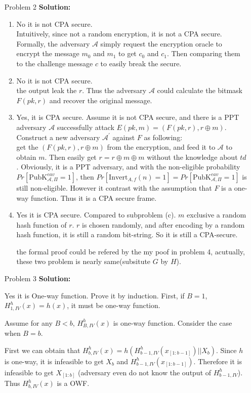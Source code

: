 \normalfont\documentclass[letterpaper,11pt]{article}
\begin{document}
\begin{enumerate}
\item [Problem 2]\textbf{Solution:}\par
	\begin{enumerate}
	\item No it is not CPA secure.\\ Intuitively, since not a random encryption, it is not a CPA secure. Formally, the adversary $\mathcal{A}$ simply request the encryption oracle to encrypt the message $m_0$ and $m_1$ to get $c_0$ and $c_1$. Then comparing them to the challenge message $c$ to easily break the secure. 
	\item No it is not CPA secure.\\
	the output leak the $r$. Thus the adversary $\mathcal{A}$ could calculate the bitmask $F(pk,r)$ and recover the original message.
	\item Yes, it is CPA secure.
	Assume it is not CPA secure, and there is a PPT adversary $\mathcal{A}$ successfully attack $E(pk,m) = (F(pk,r),r \oplus m)$.
	Construct a new adversary $\mathcal{A}^\prime$ against $F$ as following:\\
	get the $(F(pk,r),r \oplus m)$ from the encryption, and feed it to $\mathcal{A}$ to obtain $m$. Then easily get $r = r \oplus m \oplus m$ without the knowledge about $td$. Obviously, it is a PPT adversary, and with the non-eligible probability $Pr[\text{PubK}^{eav}_{\mathcal{A},\Pi} = 1]$, then $Pr[\text{Invert}_{A,f}(n) = 1] = Pr[\text{PubK}^{eav}_{\mathcal{A},\Pi} = 1]$ is still non-eligible. However it contrast with the assumption that $F$ is a one-way function. Thus it is a CPA secure frame.
	\item Yes it is CPA secure.
	Compared to subproblem (c). $m$ exclusive a random hash function of $r$. $r$ is chosen randomly, and after encoding by a random hash function, it is still a random bit-string. So it is still a CPA-secure.\par
	the formal proof could be refered by the my poof in problem 4, acutually, these two problem is nearly same(subsitute $G$ by $H$).
	\end{enumerate}
\item [Problem 3]\textbf{Solution:}\par
	Yes it is One-way function. Prove it by induction.
	First, if $B = 1$, $H^h_{1,IV}(x) = h(x)$, it must be one-way function.\par
	Assume for any $B < b$, $H^h_{B,IV}(x)$ is one-way function. Consider the case when $B = b$.\par
	First we can obtain that $H^h_{b,IV}(x)= h(H^h_{b-1,IV}(x_{[1:b-1]}) || X_b)$. Since $h$ is one-way, it is infeasible to get $X_b$ and $H^h_{b-1,IV}(x_{[1:b-1]})$. Therefore it is infeasible to get $X_{[1:b]}$ (adversary even do not know the output of $H^h_{b-1,IV}$). Thus $H^h_{b,IV}(x)$ is a OWF.

\end{enumerate}
\end{document}
